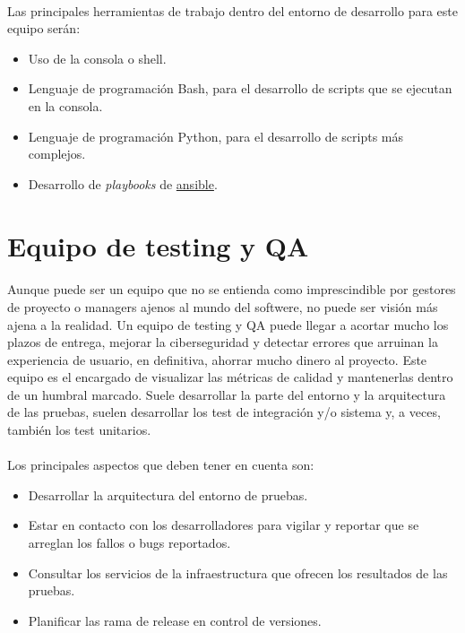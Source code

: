 \paragraph{}Las principales herramientas de trabajo dentro del entorno de desarrollo
para este equipo serán:

\begin{itemize}
    \item Uso de la consola o \gls{shell}.
    \item Lenguaje de programación Bash, para el desarrollo de \gls{scripts} que se
    ejecutan en la consola.
    \item Lenguaje de programación Python, para el desarrollo de \gls{scripts} más complejos.
    \item Desarrollo de \emph{playbooks} de \hyperref[sec:ansible]{ansible}.
\end{itemize}

\section{Equipo de testing y QA}\label{sec:testingqa}

\paragraph{}Aunque puede ser un equipo que no se entienda como imprescindible por gestores
de proyecto o managers ajenos al mundo del softwere, no puede ser visión más ajena a
la realidad. Un equipo de testing y QA puede llegar a acortar mucho los plazos de entrega,
mejorar la ciberseguridad y detectar errores que arruinan la experiencia de usuario,
en definitiva, ahorrar mucho dinero al proyecto. Este equipo es el encargado de visualizar
las métricas de calidad y mantenerlas dentro de un humbral marcado. Suele desarrollar
la parte del entorno y la arquitectura de las pruebas, suelen desarrollar los test de
integración y/o sistema y, a veces, también los test unitarios.

\paragraph{}Los principales aspectos que deben tener en cuenta son:

\begin{itemize}
    \item Desarrollar la arquitectura del entorno de pruebas.
    \item Estar en contacto con los desarrolladores para vigilar y reportar que se arreglan
    los fallos o bugs reportados.
    \item Consultar los servicios de la infraestructura que ofrecen los resultados de
    las pruebas.
    \item Planificar las rama de release en control de versiones.
\end{itemize}

